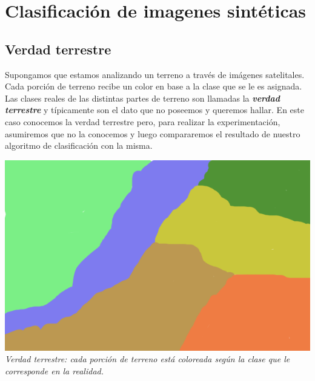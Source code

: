 \section{Clasificación de imagenes sintéticas}
\subsection{Verdad terrestre}
Supongamos que estamos analizando un terreno a través de imágenes satelitales. Cada porción de terreno recibe un color en base a la clase que se le es asignada. Las clases reales de las distintas partes de terreno son llamadas la \textit{\textbf{verdad terrestre}} y típicamente son el dato que no poseemos y queremos hallar. En este caso conocemos la verdad terrestre pero, para realizar la experimentación, asumiremos que no la conocemos y luego compararemos el resultado de nuestro algoritmo de clasificación con la misma.

\begin{center}
\includegraphics[scale=0.44]{imagenes/phantom.png}
\\
\vspace{1pt}
\footnotesize\textit{Verdad terrestre: cada porción de terreno está coloreada según la clase que le corresponde en la realidad.}
\end{center}

